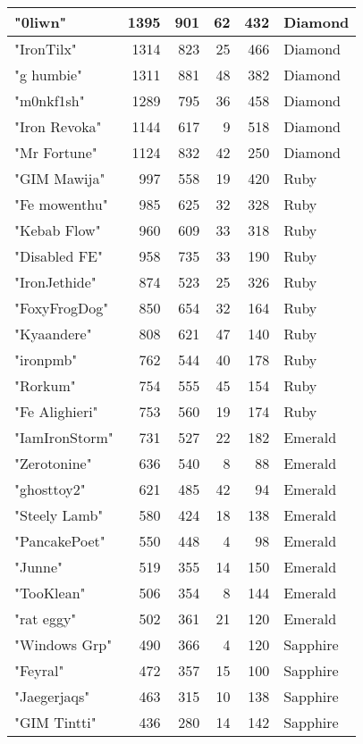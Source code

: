 \documentclass{article}
\begin{document}
\begin{table}[htbp]
\begin{tabular}{|l|r|r|r|r|l|}
"0liwn" & 1395 & 901 & 62 & 432 & Diamond \\ \hline
"IronTilx" & 1314 & 823 & 25 & 466 & Diamond \\ \hline
"g humbie" & 1311 & 881 & 48 & 382 & Diamond \\ \hline
"m0nkf1sh" & 1289 & 795 & 36 & 458 & Diamond \\ \hline
"Iron Revoka" & 1144 & 617 & 9 & 518 & Diamond \\ \hline
"Mr Fortune" & 1124 & 832 & 42 & 250 & Diamond \\ \hline
"GIM Mawija" & 997 & 558 & 19 & 420 & Ruby \\ \hline
"Fe mowenthu" & 985 & 625 & 32 & 328 & Ruby \\ \hline
"Kebab Flow" & 960 & 609 & 33 & 318 & Ruby \\ \hline
"Disabled FE" & 958 & 735 & 33 & 190 & Ruby \\ \hline
"IronJethide" & 874 & 523 & 25 & 326 & Ruby \\ \hline
"FoxyFrogDog" & 850 & 654 & 32 & 164 & Ruby \\ \hline
"Kyaandere" & 808 & 621 & 47 & 140 & Ruby \\ \hline
"ironpmb" & 762 & 544 & 40 & 178 & Ruby \\ \hline
"Rorkum" & 754 & 555 & 45 & 154 & Ruby \\ \hline
"Fe Alighieri" & 753 & 560 & 19 & 174 & Ruby \\ \hline
"IamIronStorm" & 731 & 527 & 22 & 182 & Emerald \\ \hline
"Zerotonine" & 636 & 540 & 8 & 88 & Emerald \\ \hline
"ghosttoy2" & 621 & 485 & 42 & 94 & Emerald \\ \hline
"Steely Lamb" & 580 & 424 & 18 & 138 & Emerald \\ \hline
"PancakePoet" & 550 & 448 & 4 & 98 & Emerald \\ \hline
"Junne" & 519 & 355 & 14 & 150 & Emerald \\ \hline
"TooKlean" & 506 & 354 & 8 & 144 & Emerald \\ \hline
"rat eggy" & 502 & 361 & 21 & 120 & Emerald \\ \hline
"Windows Grp" & 490 & 366 & 4 & 120 & Sapphire \\ \hline
"Feyral" & 472 & 357 & 15 & 100 & Sapphire \\ \hline
"Jaegerjaqs" & 463 & 315 & 10 & 138 & Sapphire \\ \hline
"GIM Tintti" & 436 & 280 & 14 & 142 & Sapphire \\ \hline

\end{tabular}
\end{table}
\end{document}
